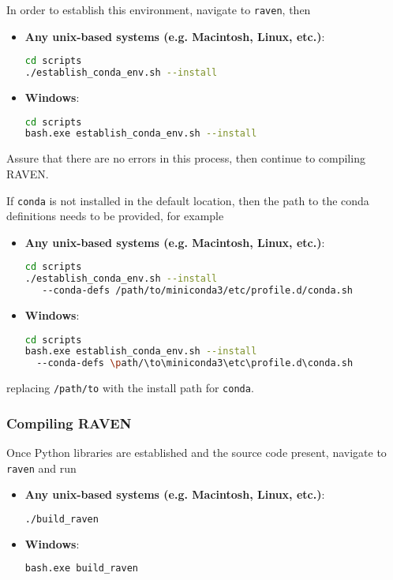 In order to establish this environment, navigate to \texttt{raven}, then
\begin{itemize}

  \item \textbf{Any unix-based systems (e.g. Macintosh, Linux, etc.)}:
\begin{lstlisting}[language=bash]
cd scripts
./establish_conda_env.sh --install
\end{lstlisting}
  \item \textbf{Windows}:
  \begin{lstlisting}[language=bash]
cd scripts
bash.exe establish_conda_env.sh --install
\end{lstlisting}
  
\end{itemize}
Assure that there are no errors in this process, then continue to compiling RAVEN.

\nb If \texttt{conda} is not installed in the default location, then the path to the conda definitions
needs to be provided, for example

\begin{itemize}

  \item \textbf{Any unix-based systems (e.g. Macintosh, Linux, etc.)}:
\begin{lstlisting}[language=bash]
cd scripts
./establish_conda_env.sh --install
   --conda-defs /path/to/miniconda3/etc/profile.d/conda.sh
\end{lstlisting}
  \item \textbf{Windows}:
  \begin{lstlisting}[language=bash]
cd scripts
bash.exe establish_conda_env.sh --install
  --conda-defs \path/\to\miniconda3\etc\profile.d\conda.sh
\end{lstlisting}
  
\end{itemize}

replacing \texttt{/path/to} with the install path for \texttt{conda}.

\subsubsection{Compiling RAVEN}
Once Python libraries are established and the source code present, navigate to \texttt{raven} and run


\begin{itemize}

  \item \textbf{Any unix-based systems (e.g. Macintosh, Linux, etc.)}:
\begin{lstlisting}[language=bash]
./build_raven
\end{lstlisting}
  \item \textbf{Windows}:
  \begin{lstlisting}[language=bash]
bash.exe build_raven
\end{lstlisting}
  
\end{itemize}

